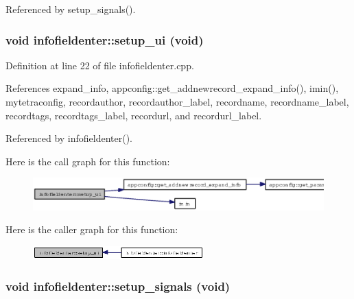 Referenced by setup\_\-signals().
\subsubsection{\setlength{\rightskip}{0pt plus 5cm}void infofieldenter::setup\_\-ui (void)\hspace{0.3cm}{\tt  [private]}}\label{classinfofieldenter_108d06e5be71bc7208f6b867d0c487d2}




Definition at line 22 of file infofieldenter.cpp.

References expand\_\-info, appconfig::get\_\-addnewrecord\_\-expand\_\-info(), imin(), mytetraconfig, recordauthor, recordauthor\_\-label, recordname, recordname\_\-label, recordtags, recordtags\_\-label, recordurl, and recordurl\_\-label.

Referenced by infofieldenter().

Here is the call graph for this function:\begin{figure}[H]
\begin{center}
\leavevmode
\includegraphics[width=376pt]{classinfofieldenter_108d06e5be71bc7208f6b867d0c487d2_cgraph}
\end{center}
\end{figure}


Here is the caller graph for this function:\begin{figure}[H]
\begin{center}
\leavevmode
\includegraphics[width=187pt]{classinfofieldenter_108d06e5be71bc7208f6b867d0c487d2_icgraph}
\end{center}
\end{figure}
\subsubsection{\setlength{\rightskip}{0pt plus 5cm}void infofieldenter::setup\_\-signals (void)\hspace{0.3cm}{\tt  [private]}}\label{classinfofieldenter_6d4a65c882986cfaa951680c354e0ba7}




